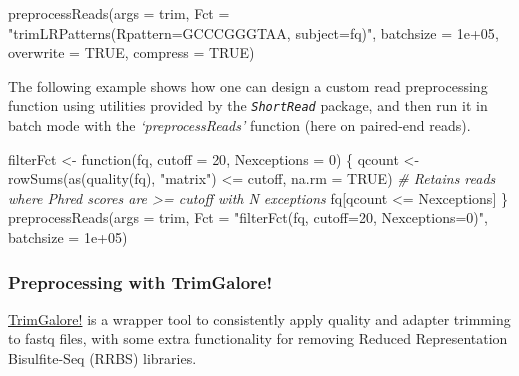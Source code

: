 \documentclass[14pt,]{article}
\newcommand{\hlnum}[1]{\textcolor[rgb]{0.816,0.125,0.439}{#1}}%
\newcommand{\hlstr}[1]{\textcolor[rgb]{0.251,0.627,0.251}{#1}}%
\newcommand{\hlcom}[1]{\textcolor[rgb]{0.502,0.502,0.502}{\textit{#1}}}%
\newcommand{\hlstd}[1]{\textcolor[rgb]{0.251,0.251,0.251}{#1}}%
\newcommand{\hlkwd}[1]{\textcolor[rgb]{0.878,0.439,0.125}{#1}}%
\newenvironment{Shaded}{\begin{myshaded}}{\end{myshaded}}
\newcommand{\DecValTok}[1]{\hlnum{#1}}
\newcommand{\FloatTok}[1]{\hlnum{#1}}
\newcommand{\ConstantTok}[1]{\hlnum{#1}}
\newcommand{\SpecialCharTok}[1]{\hlstr{#1}}
\newcommand{\StringTok}[1]{\hlstr{#1}}
\newcommand{\CommentTok}[1]{\hlcom{#1}}
\newcommand{\OtherTok}[1]{{#1}}
\newcommand{\FunctionTok}[1]{\hlstd{#1}}
\newcommand{\ControlFlowTok}[1]{\hlkwd{#1}}
\newcommand{\AttributeTok}[1]{{#1}}
\newcommand{\NormalTok}[1]{\hlstd{#1}}
\begin{document}
\begin{Shaded}
\begin{Highlighting}[]
\FunctionTok{preprocessReads}\NormalTok{(}\AttributeTok{args =}\NormalTok{ trim, }\AttributeTok{Fct =} \StringTok{"trimLRPatterns(Rpattern=\textquotesingle{}GCCCGGGTAA\textquotesingle{}, }
\StringTok{                subject=fq)"}\NormalTok{, }
    \AttributeTok{batchsize =} \FloatTok{1e+05}\NormalTok{, }\AttributeTok{overwrite =} \ConstantTok{TRUE}\NormalTok{, }\AttributeTok{compress =} \ConstantTok{TRUE}\NormalTok{)}
\end{Highlighting}
\end{Shaded}

The following example shows how one can design a custom read preprocessing function
using utilities provided by the \emph{\texttt{ShortRead}} package, and then run it
in batch mode with the \emph{`preprocessReads'} function (here on paired-end reads).

\begin{Shaded}
\begin{Highlighting}[]
\NormalTok{filterFct }\OtherTok{\textless{}{-}} \ControlFlowTok{function}\NormalTok{(fq, }\AttributeTok{cutoff =} \DecValTok{20}\NormalTok{, }\AttributeTok{Nexceptions =} \DecValTok{0}\NormalTok{) \{}
\NormalTok{    qcount }\OtherTok{\textless{}{-}} \FunctionTok{rowSums}\NormalTok{(}\FunctionTok{as}\NormalTok{(}\FunctionTok{quality}\NormalTok{(fq), }\StringTok{"matrix"}\NormalTok{) }\SpecialCharTok{\textless{}=}\NormalTok{ cutoff, }\AttributeTok{na.rm =} \ConstantTok{TRUE}\NormalTok{)}
    \CommentTok{\# Retains reads where Phred scores are \textgreater{}= cutoff with N exceptions}
\NormalTok{    fq[qcount }\SpecialCharTok{\textless{}=}\NormalTok{ Nexceptions]}
\NormalTok{\}}
\FunctionTok{preprocessReads}\NormalTok{(}\AttributeTok{args =}\NormalTok{ trim, }\AttributeTok{Fct =} \StringTok{"filterFct(fq, cutoff=20, Nexceptions=0)"}\NormalTok{, }\AttributeTok{batchsize =} \FloatTok{1e+05}\NormalTok{)}
\end{Highlighting}
\end{Shaded}

\hypertarget{preprocessing-with-trimgalore}{%
\subsubsection{Preprocessing with TrimGalore!}\label{preprocessing-with-trimgalore}}

\href{http://www.bioinformatics.babraham.ac.uk/projects/trim_galore/}{TrimGalore!} is
a wrapper tool to consistently apply quality and adapter trimming to fastq files,
with some extra functionality for removing Reduced Representation Bisulfite-Seq
(RRBS) libraries.
\end{document}
